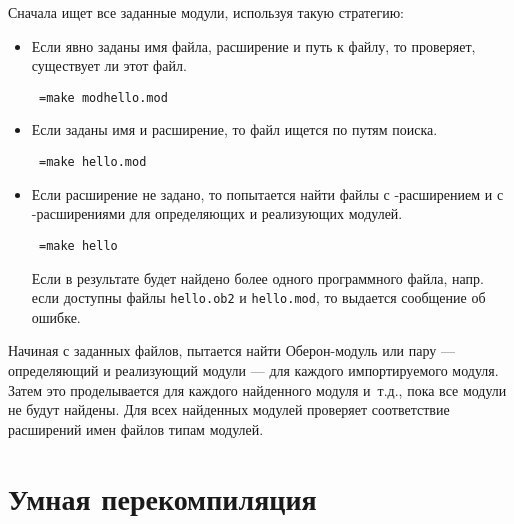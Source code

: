Сначала \xds{} ищет все заданные модули, используя такую стратегию:
\begin{itemize}
\item
        Если явно заданы имя файла, расширение и путь к файлу,
        то \xds{} проверяет, существует ли этот файл.

        \begin{flushleft} \tt
        \xc{} =make mod\DirSep{}hello.mod
        \end{flushleft}

\item
        Если заданы имя и расширение, то файл ищется по путям поиска.

        \begin{flushleft} \tt
        \xc{} =make hello.mod
        \end{flushleft}

\item
        
        Если расширение не задано, то \xds{} попытается найти
        файлы с \ot{}-расширением и с \mt{}-расширениями для
        определяющих и реализующих модулей.

        \begin{flushleft} \tt
        \xc{} =make hello
        \end{flushleft}

        Если в результате будет найдено более одного программного файла,
        напр. если доступны файлы {\tt hello.ob2} и {\tt hello.mod}, то
        выдается сообщение об ошибке.
\end{itemize}

Начиная с заданных файлов, \xds{} пытается найти Оберон-модуль или пару
--- определяющий и реализующий модули --- для каждого импортируемого модуля.
Затем это проделывается для каждого найденного модуля и~т.д., пока все
модули не будут найдены. Для всех найденных модулей 
\xds{} проверяет соответствие расширений имен файлов типам модулей.


\section{Умная перекомпиляция}\label{xc:smart}

